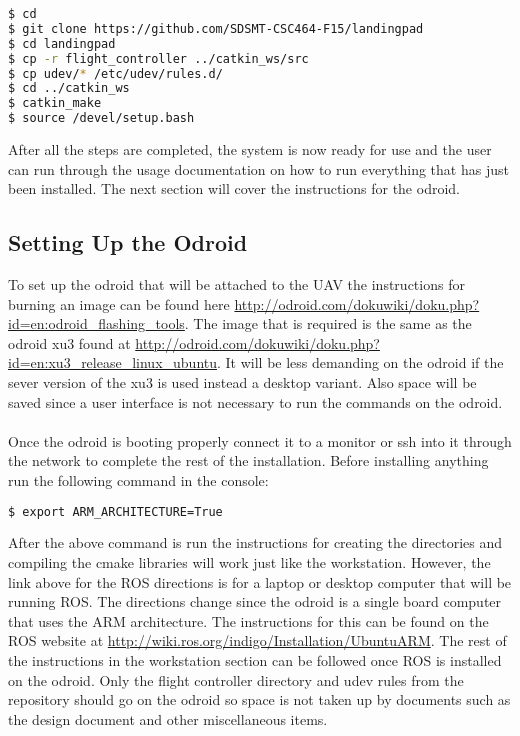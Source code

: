 \begin{lstlisting}[language=bash]
$ cd
$ git clone https://github.com/SDSMT-CSC464-F15/landingpad
$ cd landingpad
$ cp -r flight_controller ../catkin_ws/src
$ cp udev/* /etc/udev/rules.d/
$ cd ../catkin_ws
$ catkin_make
$ source /devel/setup.bash
\end{lstlisting}
After all the steps are completed, the system is now ready for use and the user can run through the usage documentation on how to run everything that has just been installed. The next section will cover the instructions for the odroid.

\subsection{Setting Up the Odroid}
To set up the odroid that will be attached to the UAV the instructions for burning an image can be found here \url{http://odroid.com/dokuwiki/doku.php?id=en:odroid_flashing_tools}. The image that is required is the same as the odroid xu3 found at \url{http://odroid.com/dokuwiki/doku.php?id=en:xu3_release_linux_ubuntu}. It will be less demanding on the odroid if the sever version of the xu3 is used instead a desktop variant. Also space will be saved since a user interface is not necessary to run the commands on the odroid.\\
\\
Once the odroid is booting properly connect it to a monitor or ssh into it through the network to complete the rest of the installation. Before installing anything run the following command in the console:
\begin{lstlisting}[language=bash]
$ export ARM_ARCHITECTURE=True
\end{lstlisting}
After the above command is run the instructions for creating the directories and compiling the cmake libraries will work just like the workstation. However, the link above for the ROS directions is for a laptop or desktop computer that will be running ROS. The directions change since the odroid is a single board computer that uses the ARM architecture. The instructions for this can be found on the ROS website at \url{http://wiki.ros.org/indigo/Installation/UbuntuARM}. The rest of the instructions in the workstation section can be followed once ROS is installed on the odroid. Only the flight controller directory and udev rules from the repository should go on the odroid so space is not taken up by documents such as the design document and other miscellaneous items.


